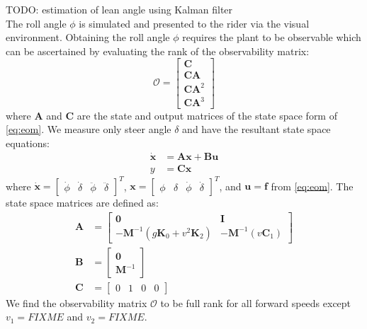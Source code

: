 \documentclass[11pt,a4paper,reqno]{amsart}
\newcommand{\damping}{v \bm{C}_1}
\newcommand{\stiffness}{g \bm{K}_0 + v^2 \bm{K}_2}
\begin{document}
TODO: estimation of lean angle using Kalman filter\\
The roll angle $ \phi $ is simulated and presented to the rider via the visual environment.
Obtaining the roll angle $ \phi $ requires the plant to be observable which can be ascertained by evaluating the rank of
the observability matrix:
\begin{equation}
    \bm{\mathcal{O}} = \begin{bmatrix} \bm{C} \\ \bm{CA} \\ \bm{CA}^2 \\ \bm{CA}^3 \end{bmatrix}
\end{equation}
where $ \bm{A} $ and $ \bm{C} $ are the state and output matrices of the state space form of \autoref{eq:eom}.
We measure only steer angle $ \delta $ and have the resultant state space equations:
\begin{equation}
\begin{aligned}
    \dot{\bm{x}} &= \bm{A x} + \bm{B u} \\
    y &= \bm{C x} \label{eq:ss}
\end{aligned}
\end{equation}
where $ \dot{\bm{x}} = \begin{bmatrix} \dot{\phi} & \dot{\delta} & \ddot{\phi} & \ddot{\delta} \end{bmatrix}^T $,
$ \bm{x} = \begin{bmatrix} \phi & \delta & \dot{\phi} & \dot{\delta} \end{bmatrix}^T $,
and $ \bm{u} = \bm{f} $ from \autoref{eq:eom}.
The state space matrices are defined as:
\begin{equation}
\begin{aligned}
    \bm{A} &= \begin{bmatrix} \bm{0} & \bm{I} \\
                -\bm{M}^{-1} (\stiffness) & -\bm{M}^{-1} (\damping) \end{bmatrix} \\
    \bm{B} &= \begin{bmatrix} \bm{0} \\ \bm{M}^{-1} \end{bmatrix} \\
    \bm{C} &= \begin{bmatrix} 0 & 1 & 0 & 0 \end{bmatrix}
\end{aligned}
\end{equation}
We find the observability matrix $ \bm{\mathcal{O}} $ to be full rank for all forward speeds except
$ v_1 = FIXME $ and $ v_2 = FIXME $.
\end{document}
